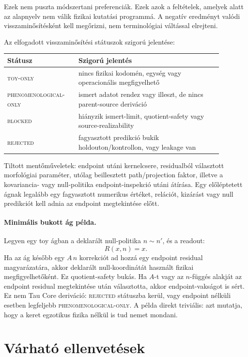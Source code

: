\documentclass[12pt]{article}
\begin{document}
Ezek nem puszta módszertani preferenciák.  Ezek azok a feltételek, amelyek
alatt az alapnyelv nem válik fizikai kutatási programmá.  A negatív eredményt
valódi visszaminősítésként kell megőrizni, nem terminológiai váltással elrejteni.

Az elfogadott visszaminősítési státuszok szigorú jelentése:
\begin{center}
\small
\begin{tabular}{L{0.28\linewidth}L{0.60\linewidth}}
\toprule
Státusz & Szigorú jelentés\\
\midrule
\textsc{toy-only} & nincs fizikai kodomén, egység vagy operacionális megfigyelhető\\
\textsc{phenomenological-only} & ismert adatot rendez vagy illeszt, de nincs parent-source deriváció\\
\textsc{blocked} & hiányzik ismert-limit, quotient-safety vagy source-realizability\\
\textsc{rejected} & fagyasztott predikció bukik holdouton/kontrollon, vagy leakage van\\
\bottomrule
\end{tabular}
\end{center}
Tiltott mentőműveletek: endpoint utáni kernelcsere, residualból választott
morfológiai paraméter, utólag beillesztett path/projection faktor, illetve a
kovariancia- vagy null-politika endpoint-inspekció utáni átírása.  Egy
előléptetett ágnak legalább egy fagyasztott numerikus értéket, relációt,
kizárást vagy null predikciót kell adnia az endpoint megtekintése előtt.

\paragraph{Minimális bukott ág példa.}
Legyen egy toy ágban a deklarált null-politika \(n\sim n'\), és a readout:
\[
  R(x,n)=x.
\]
Ha az ág később egy \(A\,n\) korrekciót ad hozzá egy endpoint residual
magyarázatára, akkor deklarált null-koordinátát használt fizikai
megfigyelhetőként.  Ez quotient-safety bukás.  Ha \(A\)-t vagy az
\(n\)-függés alakját az endpoint residual megtekintése után választotta, akkor
endpoint-vakságot is sért.  Ez nem Tau Core deriváció: \textsc{rejected}
státuszba kerül, vagy endpoint nélküli esetben legfeljebb
\textsc{phenomenological-only}.  A példa direkt triviális: azt mutatja, hogy
a keret egzotikus fizika nélkül is tud nemet mondani.

\section{Várható ellenvetések}
\end{document}
